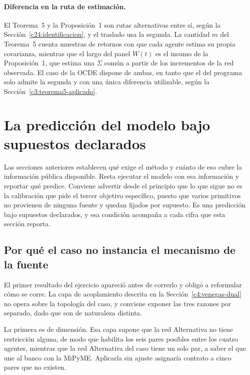 \paragraph{Diferencia en la ruta de estimación.} El Teorema~5 y la Proposición~1 son rutas alternativas entre sí, según la Sección~\ref{c24:identificacion}, y el traslado usa la segunda. La cantidad $m$ del Teorema~5 cuenta muestras de retornos con que cada agente estima su propia covarianza, mientras que el largo del panel $W(t)$ es el insumo de la Proposición~1, que estima una $\Sigma$ común a partir de los incrementos de la red observada. El caso de la OCDE dispone de ambas, en tanto que el del programa solo admite la segunda y con una única diferencia utilizable, según la Sección~\ref{c3:teorema5-aplicado}.

\section{La predicción del modelo bajo supuestos declarados}
\label{c4:prediccion}

Las secciones anteriores establecen qué exige el método y cuánto de eso cubre la información pública disponible. Resta ejecutar el modelo con esa información y reportar qué predice. Conviene advertir desde el principio que lo que sigue no es la calibración que pide el tercer objetivo específico, puesto que varios primitivos no provienen de ninguna fuente y quedan fijados por supuesto. Es una predicción bajo supuestos declarados, y esa condición acompaña a cada cifra que esta sección reporta.

\subsection{Por qué el caso no instancia el mecanismo de la fuente}
\label{c4:prediccion-topologia}

El primer resultado del ejercicio apareció antes de correrlo y obligó a reformular cómo se corre. La capa de acoplamiento descrita en la Sección~\ref{c4:venegas-dual} no opera sobre la topología del caso, y conviene exponer las tres razones por separado, dado que son de naturaleza distinta.

La primera es de dimensión. Esa capa supone que la red Alternativa no tiene restricción alguna, de modo que habilita los seis pares posibles entre los cuatro agentes, mientras que la red Alternativa del caso tiene un solo par, a saber el que une al banco con la MiPyME. Aplicarla sin ajuste asignaría contrato a cinco pares que no existen.

